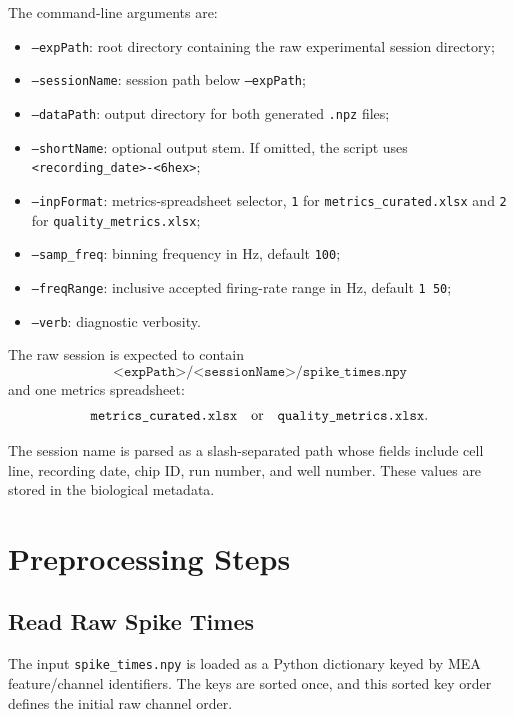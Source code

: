 \documentclass[11pt]{article}
\begin{document}
The command-line arguments are:
\begin{itemize}
  \item \texttt{--expPath}: root directory containing the raw experimental
        session directory;
  \item \texttt{--sessionName}: session path below \texttt{--expPath};
  \item \texttt{--dataPath}: output directory for both generated
        \texttt{.npz} files;
  \item \texttt{--shortName}: optional output stem. If omitted, the script
        uses \texttt{<recording\_date>-<6hex>};
  \item \texttt{--inpFormat}: metrics-spreadsheet selector,
        \texttt{1} for \texttt{metrics\_curated.xlsx} and
        \texttt{2} for \texttt{quality\_metrics.xlsx};
  \item \texttt{--samp\_freq}: binning frequency in Hz, default
        \texttt{100};
  \item \texttt{--freqRange}: inclusive accepted firing-rate range in Hz,
        default \texttt{1 50};
  \item \texttt{--verb}: diagnostic verbosity.
\end{itemize}

The raw session is expected to contain
\[
\texttt{<expPath>/<sessionName>/spike\_times.npy}
\]
and one metrics spreadsheet:
\[
\texttt{metrics\_curated.xlsx}
\quad\hbox{or}\quad
\texttt{quality\_metrics.xlsx}.
\]

The session name is parsed as a slash-separated path whose fields include
cell line, recording date, chip ID, run number, and well number. These
values are stored in the biological metadata.

\section{Preprocessing Steps}
\label{sec:steps}

\subsection{Read Raw Spike Times}

The input \texttt{spike\_times.npy} is loaded as a Python dictionary keyed
by MEA feature/channel identifiers. The keys are sorted once, and this
sorted key order defines the initial raw channel order.
\end{document}
